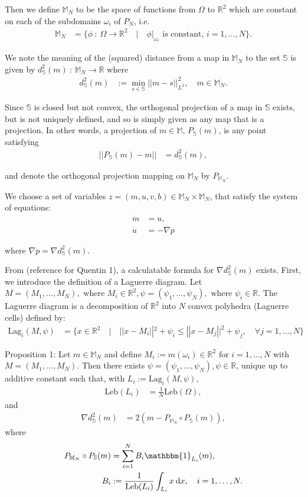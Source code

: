 \documentclass[11pt, oneside]{article}   	%
\newcommand{\R}{\mathbb{R}}
\newcommand{\MN}{\mathbb{M}_N}
\newcommand{\dsmsq}{d^{2}_{\mathbb{S}}(m)}
\newcommand{\graddsmsq}{\nabla{d^{2}_{\mathbb{S}}(m)}}
\newcommand{\Leb}{\mathrm{Leb}}
\begin{document}
Then we define \(\MN\) to be the space of functions from \(\Omega\) to \(\R^2\) which are constant on each of the subdomains \(\omega_i\) of \(P_N\), i.e.
\begin{align}
\MN &= \{ \phi \: : \: \Omega \to \R^2 \quad | \quad \phi | _{\omega_i} \text{ is constant, } i = 1,\dots,N\}.
\end{align}

We note the meaning of the (squared) distance from a map in \(\MN\) to the set \(\mathbb{S}\) is given by \(\dsmsq \: : \: \MN \to \R\) where
\begin{align}
\dsmsq &:= \min_{s \in \mathbb{S}} || m - s || ^2_{L^2}, \quad m \in \MN.
\end{align}

Since \(\mathbb{S}\) is closed but not convex, the orthogonal projection of a map in \(\mathbb{S}\) exists, but is not uniquely defined, and so is simply given as any map that is a projection. In other words, a projection of \(m \in \mathbb{M}\), \(P_\mathbb{S}(m)\), is any point satisfying
\begin{align}
|| P_\mathbb{S}(m) - m || &= \dsmsq,
\end{align}

and denote the orthogonal projection mapping on \(\MN\) by \(P_{\MN}\).

We choose a set of variables \(z = (m, u, v, b) \in \MN \times \MN \), that satisfy the system of equations:
\begin{align} 
\dot{m} &= u, \\
\dot{u} &= - \nabla p
\end{align}

where \(\nabla p = \graddsmsq\).

From (reference for Quentin 1), a calculatable formula for \(\graddsmsq\) exists. First, we introduce the definition of a Laguerre diagram. Let \(M = (M_1,\dots,M_N), \text{ where } M_i \in \R^2, \psi = (\psi_1,\dots,\psi_N), \text{ where } \psi_i \in \R\). The Laguerre diagram is a decomposition of \(\R^2\) into \(N\) convex polyhedra (Laguerre cells) defined by:
\begin{align}
\mathrm{Lag}_i(M, \psi) &= \{x \in \R^2 \quad | \quad || x - M_i ||^2 + \psi_i \le || x - M_j ||^2 + \psi_j, \quad \forall j = 1,\dots,N\}
\end{align}

Proposition 1: Let \(m \in \MN\) and define \(M_i := m(\omega_i) \in \R^2 \text{ for } i = 1,\dots,N\) with \(M = (M_1,\dots,M_N)\). Then there exists \(\psi = (\psi_1,\dots,\psi_N), \psi \in \R\), unique up to additive constant such that, with \(L_i := \mathrm{Lag}_i(M, \psi)\), 
\begin{align}
\Leb(L_i) &= \frac{1}{N}\Leb(\Omega),
\end{align}
and
\begin{align}
\graddsmsq &= 2(m - P_{\MN} \circ P_{\mathbb{S}}(m)),
\end{align}
where
\begin{align}
P_{\MN} \circ P_{\mathbb{S}}(m) &= \sum^N_{i=1} B_i \mathbbm{1}_{L_i}(m), \\
B_i &:= \frac{1}{\Leb(L_i)} \int_{L_i} x \: \mathrm{d}x, \quad i = 1,\dots,N. 
\end{align}
\end{document}
